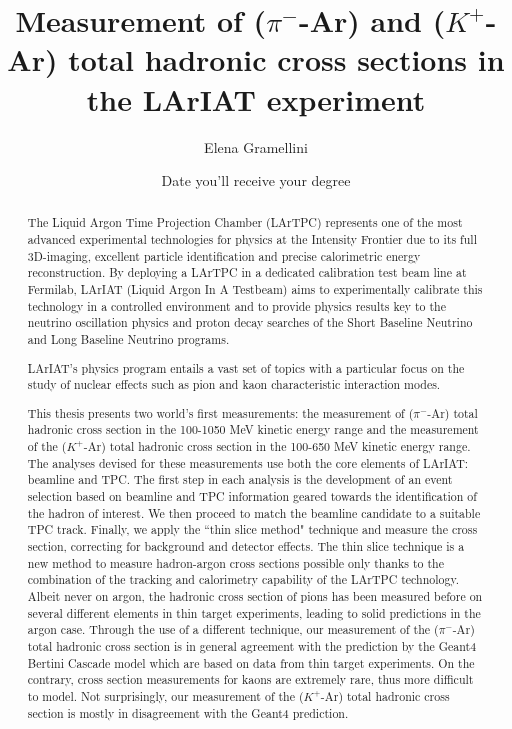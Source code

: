 \documentclass[letterpaper,12pt]{yalephd}
\begin{document}
\title{Measurement of ($\pi^-$-Ar) and ($K^+$-Ar) total hadronic cross sections in the LArIAT experiment}
\author{Elena Gramellini}
\date{Date you'll receive your degree} %

\frontmatter

\begin{abstract}

The Liquid Argon Time Projection Chamber (LArTPC) represents one of the
most advanced experimental technologies for physics at the Intensity
Frontier due to its full 3D-imaging, excellent particle identification
and precise calorimetric energy reconstruction. By deploying a LArTPC in
a dedicated calibration test beam line at Fermilab, LArIAT (Liquid
Argon In A Testbeam) aims to experimentally calibrate this technology
in a controlled environment and to provide physics results key to the
neutrino oscillation physics and proton decay searches of the Short
Baseline Neutrino and Long Baseline Neutrino programs.

LArIAT's physics program entails a vast set of topics with a
particular focus on the study of nuclear effects such as pion and
kaon characteristic interaction modes. 

This thesis presents two world's first measurements: the measurement of ($\pi^-$-Ar) total hadronic cross section in the 100-1050 MeV kinetic energy range and the measurement of the ($K^+$-Ar) total hadronic cross section in the 100-650 MeV kinetic energy range. The analyses devised for these measurements use both the core elements of LArIAT: beamline and TPC. The first step in each analysis is the development of an event selection based on  beamline and TPC information geared towards the identification of the hadron of interest. We then proceed to match the beamline candidate to a suitable TPC track. Finally,  we apply the ``thin slice method" technique and measure the cross section, correcting for background and detector effects. The thin slice technique is a new method to measure hadron-argon cross sections possible only thanks to the combination of the tracking and calorimetry capability of the LArTPC technology. 
Albeit never on argon, the hadronic cross section of pions has been measured before on several different elements in thin target experiments, leading to solid predictions in the argon case. Through the use of a different technique, our measurement of the  ($\pi^-$-Ar) total hadronic cross section is in general agreement with the prediction by the Geant4 Bertini Cascade model which are based on data from thin target experiments. On the contrary, cross section measurements for kaons are extremely rare, thus more difficult to model. Not surprisingly, our measurement of the  ($K^+$-Ar) total hadronic cross section is mostly in disagreement with the Geant4 prediction.


\end{abstract}
\end{document}
